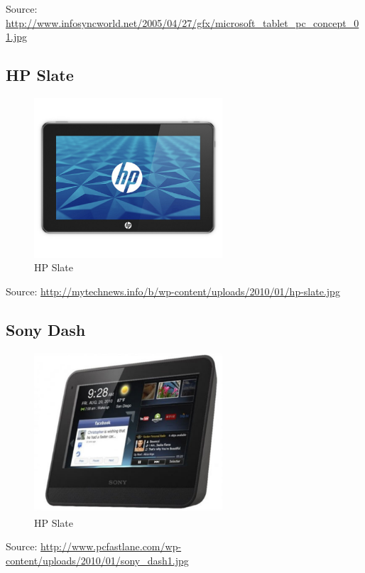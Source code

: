 \documentclass[12pt,a4paper]{article}
\begin{document}
Source: \url{http://www.infosyncworld.net/2005/04/27/gfx/microsoft_tablet_pc_concept_01.jpg}

\subsection{HP Slate}

\begin{figure}[H]
  \centering
  \includegraphics[width=7cm]{pic/bplan_05.pdf}
  \caption{HP Slate}
  \label{fig:dev3}
\end{figure}

Source: \url{http://mytechnews.info/b/wp-content/uploads/2010/01/hp-slate.jpg}

\subsection{Sony Dash}

\begin{figure}[H]
  \centering
  \includegraphics[width=7cm]{pic/bplan_06.pdf}
  \caption{HP Slate}
  \label{fig:dev4}
\end{figure}

Source: \url{http://www.pcfastlane.com/wp-content/uploads/2010/01/sony_dash1.jpg}

\pagebreak
\end{document}
